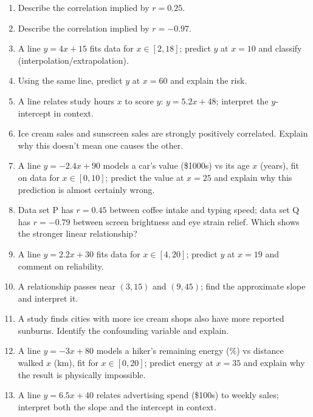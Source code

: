 \documentclass[11pt]{article}
\begin{document}
\begin{recapbox}
\begin{multicols}{2}
\small
\begin{enumerate}[leftmargin=*,itemsep=3pt]
  \item Describe the correlation implied by $r=0.25$.
  \item Describe the correlation implied by $r=-0.97$.
  \item A line $y=4x+15$ fits data for $x\in[2,18]$; predict $y$ at $x=10$ and classify (interpolation/extrapolation).
  \item Using the same line, predict $y$ at $x=60$ and explain the risk.
  \item A line relates study hours $x$ to score $y$: $y=5.2x+48$; interpret the $y$-intercept in context.
  \item Ice cream sales and sunscreen sales are strongly positively correlated. Explain why this doesn't mean one causes the other.
  \item A line $y=-2.4x+90$ models a car's value (\$1000s) vs its age $x$ (years), fit on data for $x\in[0,10]$; predict the value at $x=25$ and explain why this prediction is almost certainly wrong.
  \item Data set P has $r=0.45$ between coffee intake and typing speed; data set Q has $r=-0.79$ between screen brightness and eye strain relief. Which shows the stronger linear relationship?
  \item A line $y=2.2x+30$ fits data for $x\in[4,20]$; predict $y$ at $x=19$ and comment on reliability.
  \item A relationship passes near $(3,15)$ and $(9,45)$; find the approximate slope and interpret it.
  \item A study finds cities with more ice cream shops also have more reported sunburns. Identify the confounding variable and explain.
  \item A line $y=-3x+80$ models a hiker's remaining energy (\%) vs distance walked $x$ (km), fit for $x\in[0,20]$; predict energy at $x=35$ and explain why the result is physically impossible.
  \item A line $y=6.5x+40$ relates advertising spend (\$100s) to weekly sales; interpret both the slope and the intercept in context.
\end{enumerate}
\end{multicols}
\end{recapbox}
\end{document}
